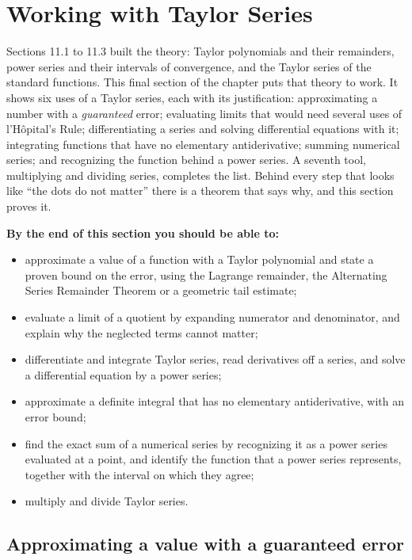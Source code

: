 \documentclass[11pt]{article}
\begin{document}
\section{Working with Taylor Series}

\begin{guide}
Sections 11.1 to 11.3 built the theory: Taylor polynomials and their remainders, power series and their intervals of convergence, and the Taylor series of the standard functions. This final section of the chapter puts that theory to work. It shows six uses of a Taylor series, each with its justification: approximating a number with a \emph{guaranteed} error; evaluating limits that would need several uses of l'H\^opital's Rule; differentiating a series and solving differential equations with it; integrating functions that have no elementary antiderivative; summing numerical series; and recognizing the function behind a power series. A seventh tool, multiplying and dividing series, completes the list. Behind every step that looks like ``the dots do not matter'' there is a theorem that says why, and this section proves it.
\end{guide}

\textbf{By the end of this section you should be able to:}
\begin{itemize}
  \item approximate a value of a function with a Taylor polynomial and state a proven bound on the error, using the Lagrange remainder, the Alternating Series Remainder Theorem or a geometric tail estimate;
  \item evaluate a limit of a quotient by expanding numerator and denominator, and explain why the neglected terms cannot matter;
  \item differentiate and integrate Taylor series, read derivatives off a series, and solve a differential equation by a power series;
  \item approximate a definite integral that has no elementary antiderivative, with an error bound;
  \item find the exact sum of a numerical series by recognizing it as a power series evaluated at a point, and identify the function that a power series represents, together with the interval on which they agree;
  \item multiply and divide Taylor series.
\end{itemize}

\subsection*{Approximating a value with a guaranteed error}
\end{document}
